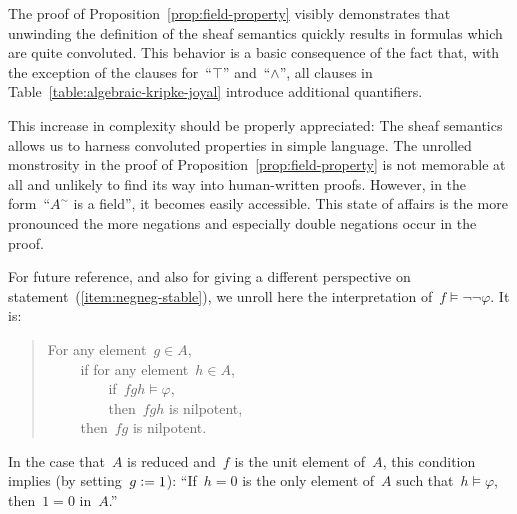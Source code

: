\documentclass{ws-rv9x6}
\begin{document}
{The proof of Proposition~\ref{prop:field-property} visibly demonstrates that
unwinding the definition of the sheaf semantics quickly results in formulas
which are quite convoluted. This behavior is a basic consequence of the fact
that, with the exception of the clauses for~``$\top$'' and~``$\wedge$'', all
clauses in Table~\ref{table:algebraic-kripke-joyal} introduce additional
quantifiers.

This increase in complexity should be properly appreciated: The sheaf semantics
allows us to harness convoluted properties in simple language. The unrolled
monstrosity in the proof of Proposition~\ref{prop:field-property} is not
memorable at all and unlikely to find its way into human-written proofs.
However, in the form~``$A^\sim$ is a field'', it becomes easily accessible.
This state of affairs is the more pronounced the more negations and especially
double negations occur in the proof.


\begin{example}\label{ex:negneg-interpretation}
For future reference, and also for giving a different
perspective on statement~(\ref{item:negneg-stable}), we unroll here the
interpretation of~$f \models \neg\neg\varphi$. It is:
\begin{quote}
For any element~$g \in A$, \\
${\qquad}$ if for any element~$h \in A$, \\
${\qquad\qquad}$ if~$fgh \models \varphi$, \\
${\qquad\qquad}$ then~$fgh$ is nilpotent, \\
${\qquad}$ then~$fg$ is nilpotent.
\end{quote}
In the case that~$A$ is reduced and~$f$ is the unit element of~$A$, this
condition implies (by setting~$g \vcentcolon= 1$): ``If~$h = 0$ is the only element of~$A$
such that~$h \models \varphi$, then~$1 = 0$ in~$A$.''
\end{example}

}
\end{document}
